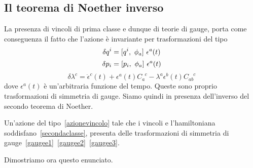 \subsection{Il teorema di Noether inverso}
    La presenza di vincoli di prima classe e dunque di teorie di gauge, porta come conseguenza il fatto che l'azione è invariante per trasformazioni del tipo
    \begin{equation} \label{gaugee1}
        \delta q^i = [q^i, ~\phi_a] ~ \epsilon^a (t)
    \end{equation}
    \begin{equation}\label{gaugee2}
        \delta p_i = [p_i, ~\phi_a] ~ \epsilon^a (t)
    \end{equation}
    \begin{equation}\label{gaugee3}
        \delta \lambda^c = \dot \epsilon^c (t) + \epsilon^a(t) C_a^{\phantom a c} - \lambda^a \epsilon^b(t) C_{ab}^{\phantom{ab} c}
    \end{equation}
    dove $\epsilon^a(t)$ è un'arbitraria funzione del tempo. Queste sono proprio trasformazioni di simmetria di gauge. Siamo quindi in presenza dell'inverso del secondo teorema di Noether.
    \begin{theorem}
        Un'azione del tipo~\eqref{azionevincolo} tale che i vincoli e l'hamiltoniana soddisfano~\eqref{secondaclasse}, presenta delle trasformazioni di simmetria di gauge~\eqref{gaugee1}~\eqref{gaugee2}~\eqref{gaugee3}.
    \end{theorem}
    Dimostriamo ora questo enunciato. 
